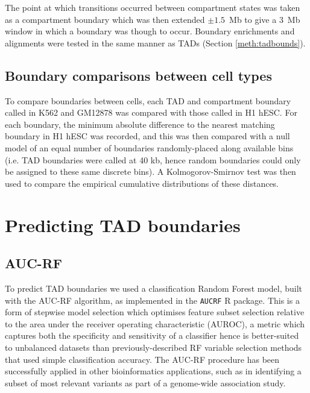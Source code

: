 \documentclass[a4paper,11pt,oneside]{book}
\begin{document}
The point at which transitions occurred between compartment states was taken as a compartment boundary which was then extended $\pm 1.5$~Mb to give a $3$~Mb window in which a boundary was though to occur. Boundary enrichments and alignments were tested in the same manner as TADs (Section \ref{meth:tadbounds}).

\subsection{Boundary comparisons between cell types}\label{meth:boundcompare}

To compare boundaries between cells, each TAD and compartment boundary called in K562 and GM12878 was compared with those called in H1 hESC. For each boundary, the minimum absolute difference to the nearest matching boundary in H1 hESC was recorded, and this was then compared with a null model of an equal number of boundaries randomly-placed along available bins (i.e. TAD boundaries were called at 40 kb, hence random boundaries could only be assigned to these same discrete bins). A Kolmogorov-Smirnov test was then used to compare the empirical cumulative distributions of these distances.

\section{Predicting TAD boundaries}\label{meth:tadpred}

\subsection{AUC-RF}\label{meth:aucrf}

To predict TAD boundaries we used a classification Random Forest model, built with the AUC-RF algorithm,\cite{Calle2011} as implemented in the \texttt{AUCRF} R package.\cite{aucrf} This is a form of stepwise model selection which optimises feature subset selection relative to the area under the receiver operating characteristic (AUROC), a metric which captures both the specificity and sensitivity of a classifier hence is better-suited to unbalanced datasets than previously-described RF variable selection methods that used simple classification accuracy.\cite{Diaz2006, Chen2012} The AUC-RF procedure has been successfully applied in other bioinformatics applications, such as in identifying a subset of most relevant variants as part of a genome-wide association study.\cite{DeMaturana2013} 
\end{document}
